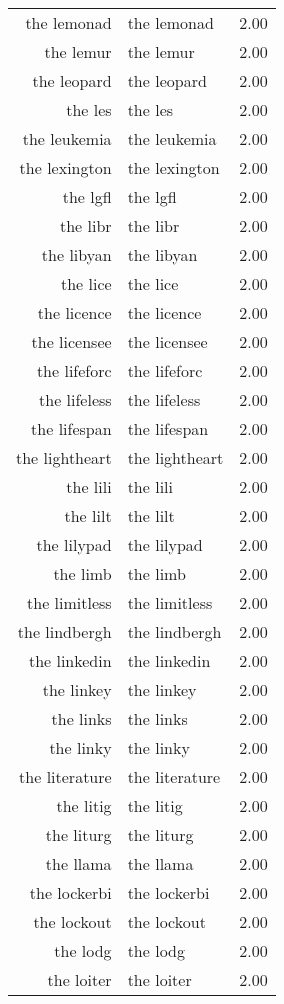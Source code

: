 \begin{table}[ht]
\begin{tabular}{rlr}
  the lemonad & the lemonad & 2.00 \\ 
  the lemur & the lemur & 2.00 \\ 
  the leopard & the leopard & 2.00 \\ 
  the les & the les & 2.00 \\ 
  the leukemia & the leukemia & 2.00 \\ 
  the lexington & the lexington & 2.00 \\ 
  the lgfl & the lgfl & 2.00 \\ 
  the libr & the libr & 2.00 \\ 
  the libyan & the libyan & 2.00 \\ 
  the lice & the lice & 2.00 \\ 
  the licence & the licence & 2.00 \\ 
  the licensee & the licensee & 2.00 \\ 
  the lifeforc & the lifeforc & 2.00 \\ 
  the lifeless & the lifeless & 2.00 \\ 
  the lifespan & the lifespan & 2.00 \\ 
  the lightheart & the lightheart & 2.00 \\ 
  the lili & the lili & 2.00 \\ 
  the lilt & the lilt & 2.00 \\ 
  the lilypad & the lilypad & 2.00 \\ 
  the limb & the limb & 2.00 \\ 
  the limitless & the limitless & 2.00 \\ 
  the lindbergh & the lindbergh & 2.00 \\ 
  the linkedin & the linkedin & 2.00 \\ 
  the linkey & the linkey & 2.00 \\ 
  the links & the links & 2.00 \\ 
  the linky & the linky & 2.00 \\ 
  the literature & the literature & 2.00 \\ 
  the litig & the litig & 2.00 \\ 
  the liturg & the liturg & 2.00 \\ 
  the llama & the llama & 2.00 \\ 
  the lockerbi & the lockerbi & 2.00 \\ 
  the lockout & the lockout & 2.00 \\ 
  the lodg & the lodg & 2.00 \\ 
  the loiter & the loiter & 2.00 \\ 

\end{tabular}
\end{table}
